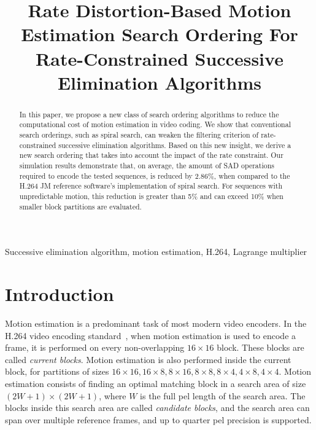 \documentclass{article}
\title{Rate Distortion-Based Motion Estimation Search Ordering For Rate-Constrained Successive Elimination Algorithms}
\begin{document}
\maketitle

\begin{abstract}
\vspace{-0.1em}
In this paper, we propose a new class of search ordering algorithms to reduce
the computational cost of motion estimation in video coding. We show that
conventional search orderings, such as spiral search, can weaken the filtering
criterion of rate-constrained successive elimination algorithms. Based on this
new insight, we derive a new search ordering that takes into account the impact
of the rate constraint. Our simulation results demonstrate that, on average, the
amount of SAD operations required to encode the tested sequences, is reduced
by 2.86\%, when compared to the H.264 JM reference software's implementation of
spiral search. For sequences with unpredictable motion, this reduction is greater than
5\% and can exceed 10\% when smaller block partitions are evaluated.
\end{abstract}

\begin{keywords}
\small{Successive elimination algorithm, motion estimation, H.264, Lagrange multiplier}
\end{keywords}

\vspace{-0.5em}
\section{Introduction}
\vspace{-0.2em}
\label{sec:intro}
Motion estimation is a predominant task of most modern video encoders. In the
H.264 video encoding standard~\cite{Wiegand2003}, when motion estimation is used
to encode a frame, it is performed on every non-overlapping $16\!\times\!16$
block. These blocks are called \textit{current blocks}. Motion estimation is
also performed inside the current block, for partitions of sizes $16\!\times\!16,
16\!\times\!8, 8\!\times\!16, 8\!\times\!8, 8\!\times\!4, 4\!\times\!8, 4\!\times\!4$.
Motion estimation consists of finding an optimal matching block in a search area
of size $(2W+1)\times(2W+1)$, where $W$ is the full pel length of the search
area. The blocks inside this search area are called \textit{candidate blocks},
and the search area can span over multiple reference frames, and up to quarter
pel precision is supported.
\end{document}
